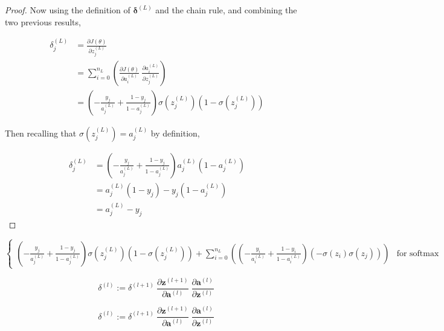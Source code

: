 \documentclass{article}
\begin{document}
\begin{proof}
            Now using the definition of $\mathbf{\delta}^{(L)}$ and the chain rule, and combining the two previous results,
            
            $$ \begin{aligned}
            \delta^{(L)}_j &= \frac{\partial J(\theta)}{\partial z^{(L)}_j} \\
            &= \sum_{i = 0}^{n_L} \left( \frac{\partial J(\theta)}{\partial a^{(L)}_i} \ \frac{\partial a^{(L)}_i}{\partial z^{(L)}_j} \right) \\
            &= \left( - \frac{y_j}{a^{(L)}_j} + \frac{1 - y_j}{1 - a^{(L)}_j} \right) \sigma(z^{(L)}_j) \left( 1 - \sigma(z^{(L)}_j) \right)
            \end{aligned} $$
            
            Then recalling that $\sigma(z^{(L)}_j) = a^{(L)}_j$ by definition,
            
            $$ \begin{aligned}
            \delta^{(L)}_j &= \left( - \frac{y_j}{a^{(L)}_j} + \frac{1 - y_j}{1 - a^{(L)}_j} \right) a^{(L)}_j \left( 1 - a^{(L)}_j \right) \\
            &= a^{(L)}_j (1 - y_j) - y_j (1 - a^{(L)}_j) \\
            &= a^{(L)}_j - y_j
            \end{aligned} $$
            
    
    
    
        \end{proof}





$$ \begin{cases}
\left( - \frac{y_j}{a^{(L)}_j} + \frac{1 - y_j}{1 - a^{(L)}_j} \right) \sigma(z^{(L)}_j) \left( 1 - \sigma(z^{(L)}_j) \right) + \sum_{i=0}^{n_L} \left( \left( - \frac{y_i}{a^{(L)}_i} + \frac{1 - y_i}{1 - a^{(L)}_i} \right) \left( - \sigma(z_i) \sigma(z_j) \right) \right) & \text{for softmax activation}
\end{cases}$$
        
        
        $$
        \delta^{(l)} :=
        \delta^{(l+1)} \
        \frac{\partial \mathbf{z}^{(l+1)}}{\partial \mathbf{a}^{(l)}} \
        \frac{\partial \mathbf{a}^{(l)}}{\partial \mathbf{z}^{(l)}} \
        $$
        
        
        
        $$
        \delta^{(l)} :=
            \delta^{(l+1)} \
            \frac{\partial \mathbf{z}^{(l+1)}}{\partial \mathbf{a}^{(l)}} \
            \frac{\partial \mathbf{a}^{(l)}}{\partial \mathbf{z}^{(l)}} \
        $$
        
\end{document}
